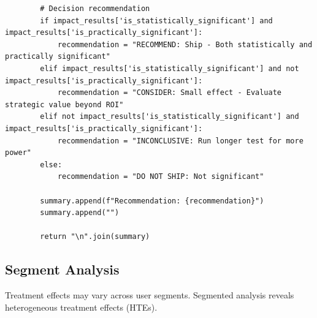 \begin{lstlisting}
        # Decision recommendation
        if impact_results['is_statistically_significant'] and impact_results['is_practically_significant']:
            recommendation = "RECOMMEND: Ship - Both statistically and practically significant"
        elif impact_results['is_statistically_significant'] and not impact_results['is_practically_significant']:
            recommendation = "CONSIDER: Small effect - Evaluate strategic value beyond ROI"
        elif not impact_results['is_statistically_significant'] and impact_results['is_practically_significant']:
            recommendation = "INCONCLUSIVE: Run longer test for more power"
        else:
            recommendation = "DO NOT SHIP: Not significant"

        summary.append(f"Recommendation: {recommendation}")
        summary.append("")

        return "\n".join(summary)

\end{lstlisting}

\subsection{Segment Analysis}

Treatment effects may vary across user segments. Segmented analysis reveals heterogeneous treatment effects (HTEs).

